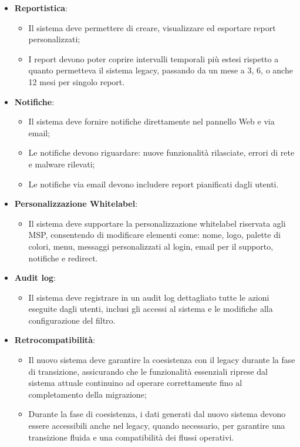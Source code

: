\begin{itemize}
  \item \textbf{Reportistica}:
    \begin{itemize}
      \item Il sistema deve permettere di creare, visualizzare ed esportare report personalizzati;
      \item I report devono poter coprire intervalli temporali più estesi rispetto a quanto permetteva il sistema legacy, passando da un mese a 3, 6, o anche 12 mesi per singolo report.
    \end{itemize}

  \item \textbf{Notifiche}:
    \begin{itemize}
      \item Il sistema deve fornire notifiche direttamente nel pannello Web e via email;
      \item Le notifiche devono riguardare: nuove funzionalità rilasciate, errori di rete e malware rilevati;
      \item Le notifiche via email devono includere report pianificati dagli utenti.
    \end{itemize}

  \item \textbf{Personalizzazione Whitelabel}:
    \begin{itemize}
      \item Il sistema deve supportare la personalizzazione whitelabel riservata agli MSP, consentendo di modificare elementi come: nome, logo, palette di colori, menu, messaggi personalizzati al login, email per il supporto, notifiche e redirect.
    \end{itemize}

  \item \textbf{Audit log}:
    \begin{itemize}
      \item Il sistema deve registrare in un audit log dettagliato tutte le azioni eseguite dagli utenti, inclusi gli accessi al sistema e le modifiche alla configurazione del filtro.
    \end{itemize}

  \item \textbf{Retrocompatibilità}:
    \begin{itemize}
      \item Il nuovo sistema deve garantire la coesistenza con il legacy durante la fase di transizione, assicurando che le funzionalità essenziali riprese dal sistema attuale continuino ad operare correttamente fino al completamento della migrazione;
      \item Durante la fase di coesistenza, i dati generati dal nuovo sistema devono essere accessibili anche nel legacy, quando necessario, per garantire una transizione fluida e una compatibilità dei flussi operativi.
    \end{itemize}
\end{itemize}

